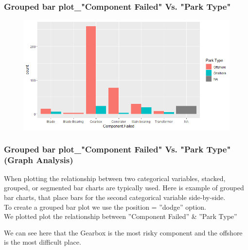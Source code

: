 \documentclass{beamer}
\begin{document}
\begin{frame}
\frametitle{Grouped bar plot\_"Component Failed" Vs. "Park Type"}


\begin{figure}
\includegraphics[width=1\linewidth]{Seminar_2_images/R/b vatten 1.png}
\end{figure}
\end{frame}
\begin{frame}
\frametitle{Grouped bar plot\_"Component Failed" Vs. "Park Type"  (Graph Analysis)}
When plotting the relationship between two categorical variables, stacked,
grouped, or segmented bar charts are typically used.
Here is example of grouped bar charts, that place bars for the second
categorical variable side-by-side.\\ To create a grouped bar plot we use the
position = ”dodge” option.\\ 
We plotted plot the relationship between ”Component Failed” & ”Park Type”\newline

We can see here that the Gearbox is the most risky component and the offshore is the most difficult place.\\

\end{frame}
\end{document}
